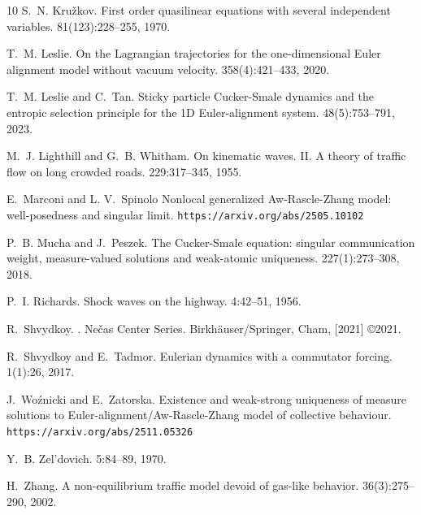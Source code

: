 \documentclass[11pt,a4paper,oneside]{amsart}
\begin{document}
\begin{thebibliography}{10}
 S.~N. Kru\v{z}kov.
\newblock First order quasilinear equations with several independent variables.
 81(123):228--255, 1970.

 T.~M. Leslie.
\newblock On the {L}agrangian trajectories for the one-dimensional {E}uler
  alignment model without vacuum velocity.
 358(4):421--433, 2020.

 T.~M. Leslie and C.~Tan.
\newblock Sticky particle {C}ucker-{S}male dynamics and the entropic selection
  principle for the 1{D} {E}uler-alignment system.
 48(5):753--791, 2023.

 M.~J. Lighthill and G.~B. Whitham.
\newblock On kinematic waves. {I}{I}. {A} theory of traffic flow on long crowded roads.
 229:317--345, 1955.

 E.~Marconi and L. V.~Spinolo
\newblock Nonlocal generalized {A}w-{R}ascle-{Z}hang model: well-posedness and singular limit.
\newblock %
{\tt https://arxiv.org/abs/2505.10102}

 P.~B. Mucha and J.~Peszek.
\newblock The {C}ucker-{S}male equation: singular communication weight, measure-valued solutions and weak-atomic uniqueness.
 227(1):273--308, 2018.

 P.~I. Richards.
\newblock Shock waves on the highway.
 4:42--51, 1956.

 R.~Shvydkoy.
.
\newblock Ne\v cas Center Series. Birkh\"auser/Springer, Cham, [2021] \copyright 2021.

 R.~Shvydkoy and E.~Tadmor.
\newblock Eulerian dynamics with a commutator forcing.
 1(1):26, 2017.

{J.~Woźnicki and E.~Zatorska.}
\newblock %
{Existence and weak-strong uniqueness of measure solutions to Euler-alignment/Aw-Rascle-Zhang model of collective behaviour.}
\newblock %
{\tt https://arxiv.org/abs/2511.05326}

 Y.~B. {Zel'dovich}.
 5:84--89, 1970.

 H.~Zhang.
\newblock A non-equilibrium traffic model devoid of gas-like behavior.
  36(3):275--290, 2002.

\end{thebibliography}
\end{document}
